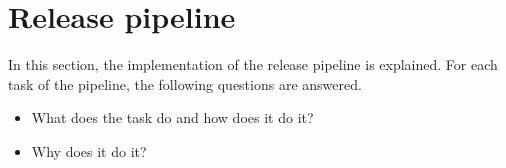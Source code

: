 \section{Release pipeline}\label{sec:release-pipeline}

In this section, the implementation of the release pipeline is explained.
For each task of the pipeline, the following questions are answered.

\begin{itemize}
    \item What does the task do and how does it do it?
    \item Why does it do it?
\end{itemize}















